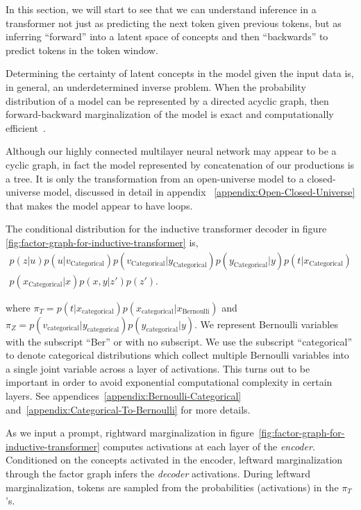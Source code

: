 \documentclass{article}
\begin{document}
In this section, we will start to see that we can understand inference in a transformer not just as predicting the next token given previous tokens, but as inferring ``forward'' into a latent space of concepts and then ``backwards'' to predict tokens in the token window.

Determining the certainty of latent concepts in the model given the input data is, in general, an underdetermined inverse problem.  When the probability distribution of a model can be represented by a directed acyclic graph, then forward-backward marginalization of the model is exact and computationally efficient~\cite{10.5555/779343.779352}.

Although our highly connected multilayer neural network may appear to be a cyclic graph, in fact the model represented by concatenation of our productions is a tree.  It is only the transformation from an open-universe model to a closed-universe model, discussed in detail in appendix ~\ref{appendix:Open-Closed-Universe} that makes the model appear to have loops.

The conditional distribution for the inductive transformer decoder in figure \ref{fig:factor-graph-for-inductive-transformer} is,
\begin{align}
\label{eq:rho_marginalized_out}
p(z|u)p(u|v_{\text{Categorical}})p(v_{\text{Categorical}}|y_{\text{Categorical}})p(y_{\text{Categorical}}|y)p(t|x_{\text{Categorical}}) \nonumber \\
p(x_{\text{Categorical}}|x)p(x, y|z')p(z').
\end{align}

where $\pi_T = p(t|x_{\text{categorical}})p(x_{\text{categorical}}|x_{\text{Bernoulli}})$ and $\pi_Z = p(v_{\text{categorical}}| y_{\text{categorical}})p(y_{\text{categorical}}|y)$.  We represent Bernoulli variables with the subscript ``Ber''  or with no subscript.  We use the subscript ``categorical'' to denote categorical distributions which collect multiple Bernoulli variables into a single joint variable across a layer of activations. This turns out to be important in order to avoid exponential computational complexity in certain layers.  See appendices~\ref{appendix:Bernoulli-Categorical} and~\ref{appendix:Categorical-To-Bernoulli} for more details.  

As we input a prompt, rightward marginalization in figure~\ref{fig:factor-graph-for-inductive-transformer} computes activations at each layer of the \emph{encoder}. Conditioned on the concepts activated in the encoder, leftward marginalization through the factor graph infers the \emph{decoder} activations.  During leftward marginalization, tokens are sampled from the probabilities (activations) in the $\pi_T$'s.  
\end{document}

